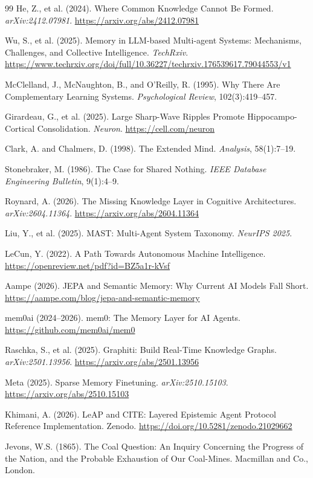 \documentclass[11pt,letterpaper]{article}
\begin{document}
\begin{thebibliography}{99}
He, Z., et al. (2024).
\newblock Where Common Knowledge Cannot Be Formed.
\newblock \textit{arXiv:2412.07981}. \url{https://arxiv.org/abs/2412.07981}

Wu, S., et al. (2025).
\newblock Memory in LLM-based Multi-agent Systems: Mechanisms, Challenges, and Collective Intelligence.
\newblock \textit{TechRxiv}. \url{https://www.techrxiv.org/doi/full/10.36227/techrxiv.176539617.79044553/v1}

McClelland, J., McNaughton, B., and O'Reilly, R. (1995).
\newblock Why There Are Complementary Learning Systems.
\newblock \textit{Psychological Review}, 102(3):419--457.

Girardeau, G., et al. (2025).
\newblock Large Sharp-Wave Ripples Promote Hippocampo-Cortical Consolidation.
\newblock \textit{Neuron}. \url{https://cell.com/neuron}

Clark, A. and Chalmers, D. (1998).
\newblock The Extended Mind.
\newblock \textit{Analysis}, 58(1):7--19.

Stonebraker, M. (1986).
\newblock The Case for Shared Nothing.
\newblock \textit{IEEE Database Engineering Bulletin}, 9(1):4--9.

Roynard, A. (2026).
\newblock The Missing Knowledge Layer in Cognitive Architectures.
\newblock \textit{arXiv:2604.11364}. \url{https://arxiv.org/abs/2604.11364}

Liu, Y., et al. (2025).
\newblock MAST: Multi-Agent System Taxonomy.
\newblock \textit{NeurIPS 2025}.

LeCun, Y. (2022).
\newblock A Path Towards Autonomous Machine Intelligence.
\newblock \url{https://openreview.net/pdf?id=BZ5a1r-kVsf}

Aampe (2026).
\newblock JEPA and Semantic Memory: Why Current AI Models Fall Short.
\newblock \url{https://aampe.com/blog/jepa-and-semantic-memory}

mem0ai (2024--2026).
\newblock mem0: The Memory Layer for AI Agents.
\newblock \url{https://github.com/mem0ai/mem0}

Raschka, S., et al. (2025).
\newblock Graphiti: Build Real-Time Knowledge Graphs.
\newblock \textit{arXiv:2501.13956}. \url{https://arxiv.org/abs/2501.13956}

Meta (2025).
\newblock Sparse Memory Finetuning.
\newblock \textit{arXiv:2510.15103}. \url{https://arxiv.org/abs/2510.15103}

Khimani, A. (2026).
\newblock LeAP and CITE: Layered Epistemic Agent Protocol Reference Implementation.
\newblock Zenodo. \url{https://doi.org/10.5281/zenodo.21029662}

Jevons, W.S. (1865).
\newblock The Coal Question: An Inquiry Concerning the Progress of the Nation, and the Probable Exhaustion of Our Coal-Mines.
\newblock Macmillan and Co., London.

\end{thebibliography}
\end{document}
